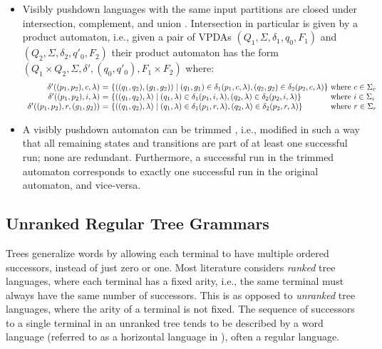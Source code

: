 \documentclass[runningheads]{llncs}
\newcommand{\T}{\Sigma} %
\begin{document}
\begin{itemize}
\item Visibly pushdown languages with the same input partitions are closed under intersection, complement, and union \cite{alurVisiblyPushdownLanguages2004}. Intersection in particular is given by a product automaton, i.e., given a pair of VPDAs $(Q_1, \T, \delta_1, q_0, F_1)$ and $(Q_2, \T, \delta_2, q'_0, F_2)$ their product automaton has the form $(Q_1 \times Q_2, \T, \delta', (q_0, q'_0), F_1 \times F_2)$ where:
  $$
  \begin{array}{r@{\ =\ }ll}
    \delta'((p_1, p_2), c, \lambda) & \{((q_1, q_2), (g_1, g_2)) \mid (q_1, g_1) \in \delta_1(p_1, c, \lambda), (q_2, g_2) \in \delta_2(p_2, c, \lambda) \} & \!\!\!\!\text{where } c \in \T_c \\
    \delta'((p_1, p_2), i, \lambda) & \{((q_1, q_2), \lambda) \mid (q_1, \lambda) \in \delta_1(p_1, i, \lambda), (q_2, \lambda) \in \delta_2(p_2, i, \lambda) \} & \!\!\!\!\text{where } i \in \T_i \\
    \delta'((p_1, p_2), r, (g_1, g_2)) & \{((q_1, q_2), \lambda) \mid (q_1, \lambda) \in \delta_1(p_1, r, \lambda), (q_2, \lambda) \in \delta_2(p_2, r, \lambda) \} & \!\!\!\!\text{where } r \in \T_r \\
  \end{array}
  $$

\item A visibly pushdown automaton can be trimmed \cite{caralpTrimmingVisiblyPushdown2015}, i.e., modified in such a way that all remaining states and transitions are part of at least one successful run; none are redundant. Furthermore, a successful run in the trimmed automaton corresponds to exactly one successful run in the original automaton, and vice-versa.
\end{itemize}

\subsection{Unranked Regular Tree Grammars} \label{sec:preliminaries-trees}

Trees generalize words by allowing each terminal to have multiple ordered successors, instead of just zero or one. Most literature considers \emph{ranked} tree languages, where each terminal has a fixed arity, i.e., the same terminal must always have the same number of successors. This is as opposed to \emph{unranked} tree languages, where the arity of a terminal is not fixed. The sequence of successors to a single terminal in an unranked tree tends to be described by a word language (referred to as a horizontal language in \cite{comonTreeAutomataTechniques2007}), often a regular language.
\end{document}
